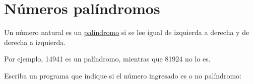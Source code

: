 \section{Números palíndromos}

Un número natural es un
\href{http://es.wikipedia.org/wiki/Pal\%C3\%ADndromo}{palíndromo} si se
lee igual de izquierda a derecha y de derecha a izquierda.

Por ejemplo, 14941 es un palíndromo, mientras que 81924 no lo es.

Escriba un programa que indique si el número ingresado es o no
palíndromo:
